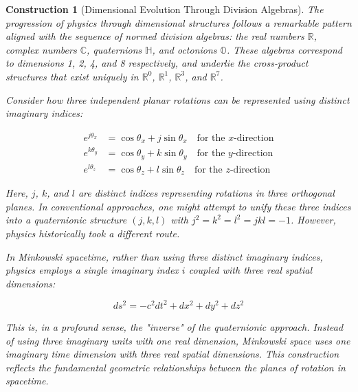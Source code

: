 \documentclass{article}
\newtheorem{construction}{Construction}
\begin{document}
\begin{construction}[Dimensional Evolution Through Division Algebras]
The progression of physics through dimensional structures follows a remarkable pattern aligned with the sequence of normed division algebras: the real numbers $\mathbb{R}$, complex numbers $\mathbb{C}$, quaternions $\mathbb{H}$, and octonions $\mathbb{O}$. These algebras correspond to dimensions 1, 2, 4, and 8 respectively, and underlie the cross-product structures that exist uniquely in $\mathbb{R}^0$, $\mathbb{R}^1$, $\mathbb{R}^3$, and $\mathbb{R}^7$.

Consider how three independent planar rotations can be represented using distinct imaginary indices:

\begin{align}
e^{j\theta_x} &= \cos\theta_x + j\sin\theta_x \quad \text{for the $x$-direction} \\
e^{k\theta_y} &= \cos\theta_y + k\sin\theta_y \quad \text{for the $y$-direction} \\
e^{l\theta_z} &= \cos\theta_z + l\sin\theta_z \quad \text{for the $z$-direction}
\end{align}

Here, $j$, $k$, and $l$ are distinct indices representing rotations in three orthogonal planes. In conventional approaches, one might attempt to unify these three indices into a quaternionic structure $(j, k, l)$ with $j^2 = k^2 = l^2 = jkl = -1$. However, physics historically took a different route.

In Minkowski spacetime, rather than using three distinct imaginary indices, physics employs a single imaginary index $i$ coupled with three real spatial dimensions:

\begin{equation}
ds^2 = -c^2dt^2 + dx^2 + dy^2 + dz^2
\end{equation}

This is, in a profound sense, the "inverse" of the quaternionic approach. Instead of using three imaginary units with one real dimension, Minkowski space uses one imaginary time dimension with three real spatial dimensions. This construction reflects the fundamental geometric relationships between the planes of rotation in spacetime.
\end{construction}
\end{document}
